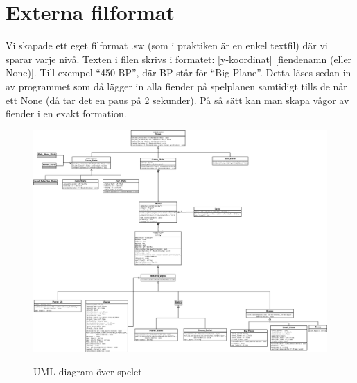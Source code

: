 \documentclass{TDP003mall}
\begin{document}
\section{Externa filformat} 
Vi skapade ett eget filformat .sw (som i praktiken är en enkel textfil) där vi sparar varje nivå. Texten i filen skrivs i formatet: [y-koordinat] [fiendenamn (eller None)]. Till exempel ``450 BP'', där BP står för ``Big Plane''. 
Detta läses sedan in av programmet som då lägger in alla fiender på spelplanen samtidigt tills de når ett None (då tar det en paus på 2 sekunder). På så sätt kan man skapa vågor av fiender i en exakt formation.
\begin{figure}[h!]
\centering
\includegraphics[scale=0.2]{UML_diagram.png}
\label{}
\caption{UML-diagram över spelet}
\end{figure}
\end{document}

